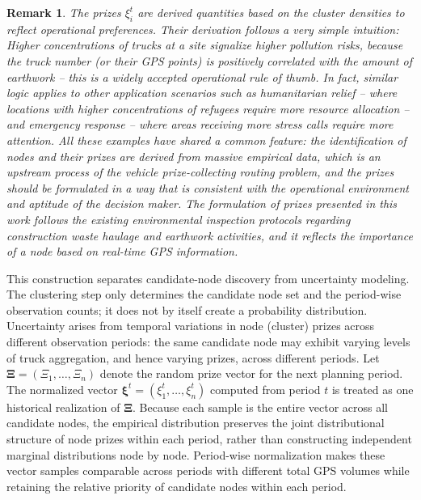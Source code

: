 \documentclass[preprint,12pt,authoryear]{elsarticle}
\newtheorem{remark}{Remark}
\theoremstyle{definition}
\begin{document}
\begin{remark}
The prizes $\xi_i^t$ are derived quantities based on the cluster densities to reflect operational preferences. Their derivation follows a very simple intuition: Higher concentrations of trucks at a site signalize higher pollution risks, because the truck number (or their GPS points) is positively correlated with the amount of earthwork -- this is a widely accepted operational rule of thumb. In fact, similar logic applies to other application scenarios such as humanitarian relief -- where locations with higher concentrations of refugees require more resource allocation -- and emergency response -- where areas receiving more stress calls require more attention. All these examples have shared a common feature: the identification of nodes and their prizes are derived from massive empirical data, which is an upstream process of the vehicle prize-collecting routing problem, and the prizes should be formulated in a way that is consistent with the operational environment and aptitude of the decision maker. The formulation of prizes presented in this work follows the existing environmental inspection protocols  regarding construction waste haulage and earthwork activities, and it reflects the importance of a node based on real-time GPS information.
\end{remark}


This construction separates candidate-node discovery from uncertainty modeling. The clustering step only determines the candidate node set and the period-wise observation counts; it does not by itself create a probability distribution. Uncertainty arises from temporal variations in node (cluster) prizes across different observation periods: the same candidate node may exhibit varying levels of truck aggregation, and hence varying prizes, across different periods.  Let $\boldsymbol{\Xi}=(\Xi_1,\ldots,\Xi_n)$ denote the random prize vector for the next planning period. The normalized vector $\boldsymbol{\xi}^t=(\xi_1^t,\ldots,\xi_n^t)$ computed from period $t$ is treated as one historical realization of $\boldsymbol{\Xi}$. Because each sample is the entire vector across all candidate nodes, the empirical distribution preserves the joint distributional structure of node prizes within each period, rather than constructing independent marginal distributions node by node. Period-wise normalization makes these vector samples comparable across periods with different total GPS volumes while retaining the relative priority of candidate nodes within each period.
\end{document}
